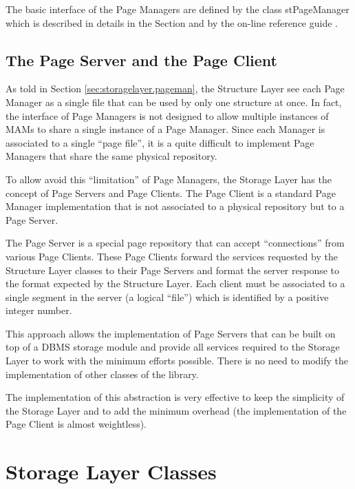 The basic interface of the Page Managers are defined by the class stPageManager which is described in details in the Section \label{sec:storagelayer.stPageManager} and by the on-line reference guide \cite{onlineman}.

\subsection{The Page Server and the Page Client}
\label{sec:storagelayer.clientserver}

As told in Section \ref{sec:storagelayer.pageman}, the Structure Layer see each Page Manager as a single file that can be used by only one structure at once. In fact, the interface of Page Managers is not designed to allow multiple instances of MAMs to share a single instance of a Page Manager. Since each Manager is associated to a single ``page file'', it is a quite difficult to implement Page Managers that share the same physical repository.

To allow avoid this ``limitation'' of Page Managers, the Storage Layer has the concept of Page Servers and Page Clients. The Page Client is a standard Page Manager implementation that is not associated to a physical repository but to a Page Server.

The Page Server is a special page repository that can accept ``connections'' from various Page Clients. These Page Clients forward the services requested by the Structure Layer classes to their Page Servers and format the server response to the format expected by the Structure Layer. Each client must be associated to a single segment in the server (a logical ``file'') which is identified by a positive integer number.

This approach allows the implementation of Page Servers that can be built on top of a DBMS storage module and provide all services required to the Storage Layer to work with the minimum efforts possible. There is no need to modify the implementation of other classes of the library.

The implementation of this abstraction is very effective to keep the simplicity of the Storage Layer and to add the minimum overhead (the implementation of the Page Client is almost weightless).

\section{Storage Layer Classes}


